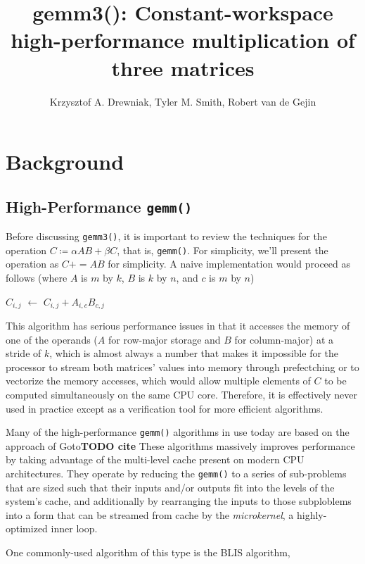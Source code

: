 \documentclass[12pt]{article}
\title{gemm3(): Constant-workspace high-performance multiplication of three matrices}
\author{Krzysztof A. Drewniak, Tyler M. Smith, Robert van de Gejin}
\newcommand*\Let[2]{\State #1 $\gets$ #2}
\newcommand{\pluseq}{\mathrel{{+}{=}}}
\newcommand{\gemmt}{{\texttt{gemm3()}}}
\newcommand{\gemm}{{\texttt{gemm()}}}
\begin{document}
\maketitle{}
\section{Background}
\subsection{High-Performance \gemm{}}
Before discussing \gemmt{}, it is important to review the techniques for the operation $C \coloneqq \alpha AB + \beta C$, that is, \gemm{}.
For simplicity, we'll present the operation as $C \pluseq AB$ for simplicity.
A naive implementation would proceed as follows (where $A$ is $m$ by $k$, $B$ is $k$ by $n$, and $c$ is $m$ by $n$)
\begin{algorithm}
  \caption{Naive implementation of \gemm{}}
  \begin{algorithmic}[1]
    \Let{$C_{i, j}$}{$C_{i, j} + A_{i, c} B_{c, j}$}
    \EndFor{}
    \EndFor{}
    \EndFor{}
    \EndProcedure{}
  \end{algorithmic}
\end{algorithm}
This algorithm has serious performance issues in that it accesses the memory of one of the operands ($A$ for row-major storage and $B$ for column-major) at a stride of $k$, which is almost always a number that makes it impossible for the processor to stream both matrices' values into memory through prefectching or to vectorize the memory accesses, which would allow multiple elements of $C$ to be computed simultaneously on the same CPU core.
Therefore, it is effectively never used in practice except as a verification tool for more efficient algorithms.

Many of the high-performance \gemm{} algorithms in use today are based on the approach of Goto\textbf{TODO cite}
These algorithms massively improves performance by taking advantage of the multi-level cache present on modern CPU architectures.
They operate by reducing the \gemm{} to a series of sub-problems that are sized such that their inputs and/or outputs fit into the levels of the system's cache, and additionally by rearranging the inputs to those subploblems into a form that can be streamed from cache by the \emph{microkernel}, a highly-optimized inner loop.

One commonly-used algorithm of this type is the BLIS algorithm,
\end{document}

